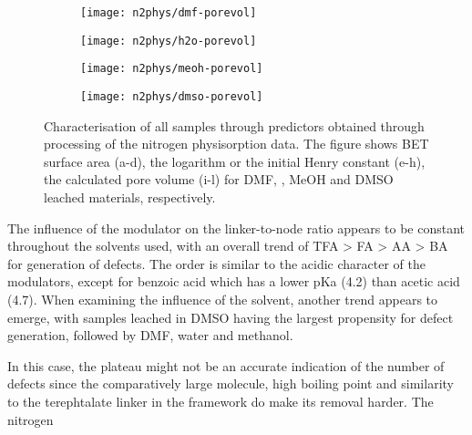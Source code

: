 \begin{figure}[htb]
    \begin{subfigure}{0.25\linewidth}
        \texttt{[image: n2phys/dmf-porevol]}%
        \caption{}%
        \label{def:fgr:n2phys-dmf-porevol}
    \end{subfigure}%
    \begin{subfigure}{0.25\linewidth}
        \texttt{[image: n2phys/h2o-porevol]}%
        \caption{}%
        \label{def:fgr:n2phys-h2o-porevol}
    \end{subfigure}%
    \begin{subfigure}{0.25\linewidth}
        \texttt{[image: n2phys/meoh-porevol]}%
        \caption{}%
        \label{def:fgr:n2phys-meoh-porevol}
    \end{subfigure}%
    \begin{subfigure}{0.25\linewidth}
        \texttt{[image: n2phys/dmso-porevol]}%
        \caption{}%
        \label{def:fgr:n2phys-dmso-porevol}
    \end{subfigure}%

    \caption{Characterisation of all samples through predictors
    obtained through processing of the nitrogen physisorption 
    data. The figure shows BET surface area (a-d), the logarithm
    or the initial Henry constant (e-h), the calculated pore volume 
    (i-l) for DMF, , MeOH and DMSO leached materials,
    respectively.}%
    \label{def:fgr:nitrogen-predictors}
    
\end{figure}

The influence of the modulator on the linker-to-node ratio appears to be
constant throughout the solvents used, with an overall trend of 
TFA > FA > AA > BA for generation of defects. The order is similar
to the acidic character of the modulators, except for 
benzoic acid which has a lower pKa (4.2) than acetic acid (4.7). 
When examining the influence of the solvent, another trend appears
to emerge, with samples leached in DMSO having the largest propensity
for defect generation, followed by DMF, water and methanol.

In this 
case, the plateau might not be an accurate indication of the number of 
defects since the comparatively large molecule, high boiling point and
similarity to the terephtalate linker in the framework do make its 
removal harder. The nitrogen 